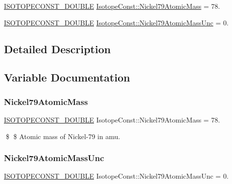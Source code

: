 \begin{DoxyCompactItemize}
\item 
\mbox{\hyperlink{group___isotope_const-_macros_ga8f45a7272ce02c0b4c65c44636ed719a}{I\+S\+O\+T\+O\+P\+E\+C\+O\+N\+S\+T\+\_\+\+D\+O\+U\+B\+LE}} \mbox{\hyperlink{group___isotope_const-_nickel-_ni79_ga0ce9618b8bcf78d22c463d697bb8fcd5}{Isotope\+Const\+::\+Nickel79\+Atomic\+Mass}} = 78.
\item 
\mbox{\hyperlink{group___isotope_const-_macros_ga8f45a7272ce02c0b4c65c44636ed719a}{I\+S\+O\+T\+O\+P\+E\+C\+O\+N\+S\+T\+\_\+\+D\+O\+U\+B\+LE}} \mbox{\hyperlink{group___isotope_const-_nickel-_ni79_ga8fe826ea71d06a0ce97d79cf63de40b3}{Isotope\+Const\+::\+Nickel79\+Atomic\+Mass\+Unc}} = 0.
\end{DoxyCompactItemize}


\subsection{Detailed Description}


\subsection{Variable Documentation}
\mbox{\label{group___isotope_const-_nickel-_ni79_ga0ce9618b8bcf78d22c463d697bb8fcd5}} 
\subsubsection{\texorpdfstring{Nickel79\+Atomic\+Mass}{Nickel79AtomicMass}}
{\footnotesize\ttfamily \mbox{\hyperlink{group___isotope_const-_macros_ga8f45a7272ce02c0b4c65c44636ed719a}{I\+S\+O\+T\+O\+P\+E\+C\+O\+N\+S\+T\+\_\+\+D\+O\+U\+B\+LE}} Isotope\+Const\+::\+Nickel79\+Atomic\+Mass = 78.}

\$ \$ Atomic mass of Nickel-\/79 in amu. \mbox{\label{group___isotope_const-_nickel-_ni79_ga8fe826ea71d06a0ce97d79cf63de40b3}} 
\subsubsection{\texorpdfstring{Nickel79\+Atomic\+Mass\+Unc}{Nickel79AtomicMassUnc}}
{\footnotesize\ttfamily \mbox{\hyperlink{group___isotope_const-_macros_ga8f45a7272ce02c0b4c65c44636ed719a}{I\+S\+O\+T\+O\+P\+E\+C\+O\+N\+S\+T\+\_\+\+D\+O\+U\+B\+LE}} Isotope\+Const\+::\+Nickel79\+Atomic\+Mass\+Unc = 0.}


